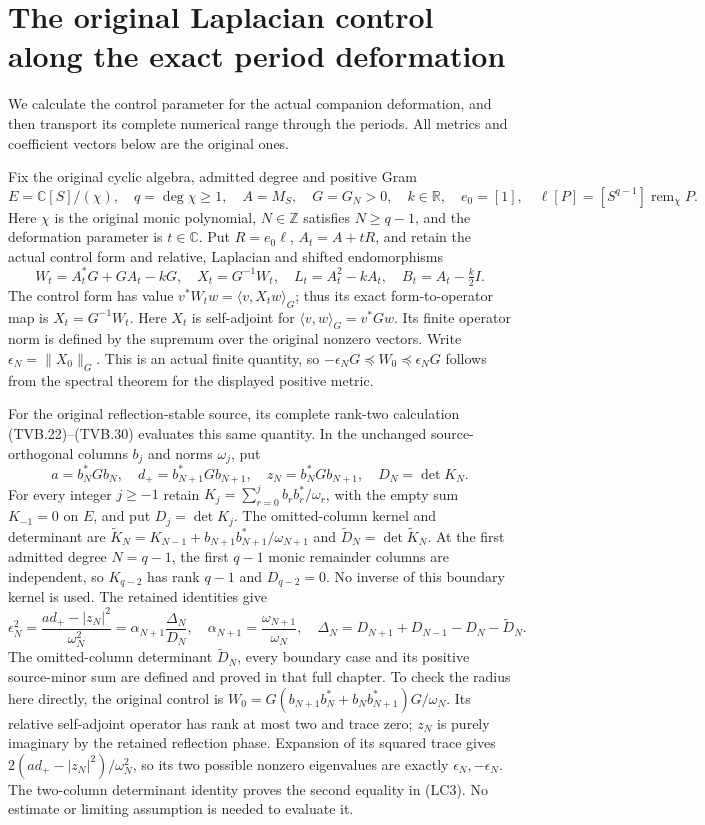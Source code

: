 \section{The original Laplacian control along the exact period deformation}
\label{sec:period-laplacian-control-bridge}

We calculate the control parameter for the actual companion deformation,
and then transport its complete numerical range through the periods.
All metrics and coefficient vectors below are the original ones.

Fix the original cyclic algebra, admitted degree and positive Gram
\[
 E=\mathbb C[S]/(\chi),\quad q=\deg\chi\ge1,\quad
 A=M_S,\quad G=G_N>0,\quad k\in\mathbb R,
 \quad e_0=[1],\quad
 \ell[P]=[S^{q-1}]\operatorname{rem}_{\chi}P.
 \tag{LC1}
\]
Here $\chi$ is the original monic polynomial, $N\in\mathbb Z$ satisfies
$N\ge q-1$, and the deformation parameter is $t\in\mathbb C$.
Put \(R=e_0\ell\), \(A_t=A+tR\), and retain the actual control form
and relative, Laplacian and shifted endomorphisms
\[
 W_t=A_t^*G+GA_t-kG,\quad X_t=G^{-1}W_t,\quad
 L_t=A_t^2-kA_t,\quad B_t=A_t-\tfrac k2I.
 \tag{LC2}
\]
The control form has value $v^*W_tw=\langle v,X_tw\rangle_G$;
thus its exact form-to-operator map is $X_t=G^{-1}W_t$.
Here \(X_t\) is self-adjoint for
\(\langle v,w\rangle_G=v^*Gw\). Its finite operator norm is defined
by the supremum over the original nonzero vectors. Write
\(\epsilon_N=\|X_0\|_G\). This is an actual finite quantity, so
\(-\epsilon_NG\preceq W_0\preceq\epsilon_NG\) follows from the
spectral theorem for the displayed positive metric.

For the original reflection-stable source, its complete rank-two
calculation (TVB.22)--(TVB.30) evaluates this same quantity. In the
unchanged source-orthogonal columns \(b_j\) and norms \(\omega_j\),
put
\[
 a=b_N^*Gb_N,\quad d_+=b_{N+1}^*Gb_{N+1},\quad
 z_N=b_N^*Gb_{N+1},\quad D_N=\det K_N.
\]
For every integer $j\ge-1$ retain
$K_j=\sum_{r=0}^{j}b_rb_r^*/\omega_r$, with the empty sum
$K_{-1}=0$ on $E$, and put $D_j=\det K_j$.
The omitted-column kernel and determinant are
$\widetilde K_N=K_{N-1}+b_{N+1}b_{N+1}^*/\omega_{N+1}$ and
$\widetilde D_N=\det\widetilde K_N$.
At the first admitted degree $N=q-1$, the first $q-1$ monic
remainder columns are independent, so $K_{q-2}$ has rank $q-1$
and $D_{q-2}=0$. No inverse of this boundary kernel is used.
The retained identities give
\[
 \epsilon_N^2=\frac{ad_+-|z_N|^2}{\omega_N^2}
       =\alpha_{N+1}\frac{\Delta_N}{D_N},
 \quad\alpha_{N+1}=\frac{\omega_{N+1}}{\omega_N},
 \quad
 \Delta_N=D_{N+1}+D_{N-1}-D_N-\widetilde D_N.
 \tag{LC3}
\]
The omitted-column determinant \(\widetilde D_N\), every boundary
case and its positive source-minor sum are defined and proved in
that full chapter. To check the radius here directly, the original
control is
\(W_0=G(b_{N+1}b_N^*+b_Nb_{N+1}^*)G/\omega_N\).
Its relative self-adjoint operator has rank at most two and trace
zero; \(z_N\) is purely imaginary by the retained reflection phase.
Expansion of its squared trace gives
\(2(ad_+-|z_N|^2)/\omega_N^2\), so its two possible nonzero
eigenvalues are exactly \(\epsilon_N,-\epsilon_N\).
The two-column determinant identity proves the second equality
in (LC3). No estimate or limiting assumption is needed to evaluate it.


